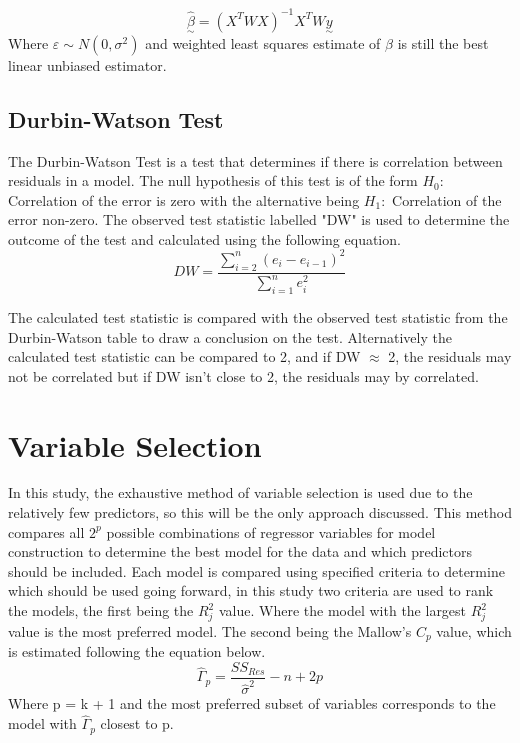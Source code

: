 \documentclass[12pt]{report}
\begin{document}
\begin{equation}
    \hat{\underset{\sim}\beta} = (X^{T}WX)^{-1}X^{T}W\underset{\sim}y
\end{equation}
Where $\varepsilon \sim N(0,\sigma^{2})$ and weighted least squares estimate of $\beta$ is still the best linear unbiased estimator.

\subsection{Durbin-Watson Test}
The Durbin-Watson Test is a test that determines if there is correlation between residuals in a model. The null hypothesis of this test is of the form $H_{0}:$ Correlation of the error is zero with the alternative being $H_{1}:$ Correlation of the error non-zero. The observed test statistic labelled "DW" is used to determine the outcome of the test and calculated using the following equation.
\begin{equation}
    DW = \frac{\sum_{i=2}^n (e_{i} - e_{i-1})^2}{\sum_{i=1}^n e_{i}^2}
\end{equation}

The calculated test statistic is compared with the observed test statistic from the Durbin-Watson table to draw a conclusion on the test. Alternatively the calculated test statistic can be compared to 2, and if DW $\approx$ 2, the residuals may not be correlated but if DW isn't close to 2, the residuals may by correlated.

\section{Variable Selection}
In this study, the exhaustive method of variable selection is used due to the relatively few predictors, so this will be the only approach discussed. This method compares all $2^p$ possible combinations of regressor variables for model construction to determine the best model for the data and which predictors should be included. Each model is compared using specified criteria to determine which should be used going forward, in this study two criteria are used to rank the models, the first being the $R_{j}^2$ value. Where the model with the largest $R_{j}^2$ value is the most preferred model. The second being the Mallow's $C_{p}$ value, which is estimated following the equation below.
\begin{equation}
    \hat{\Gamma}_{p} = \frac{SS_{Res}}{\hat{\sigma}^2} - n + 2p
\end{equation}
Where p = k + 1 and the most preferred subset of variables corresponds to the model with $\hat{\Gamma}_{p}$ closest to p.
\end{document}
